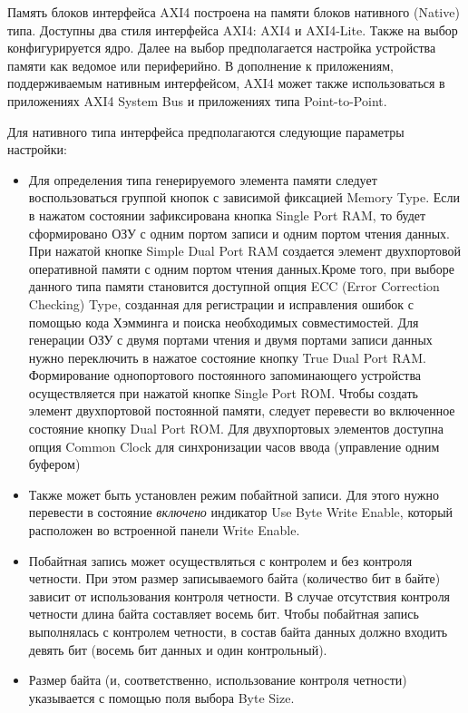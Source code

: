 Память блоков интерфейса AXI4 построена на памяти блоков нативного (Native) типа. Доступны два стиля интерфейса AXI4: AXI4 и AXI4-Lite. Также на выбор конфигурируется ядро. Далее на выбор предполагается настройка устройства памяти как ведомое или периферийно. В дополнение к приложениям, поддерживаемым нативным интерфейсом, AXI4 может также использоваться в приложениях AXI4 System Bus и приложениях типа Point-to-Point.

Для нативного типа интерфейса предполагаются следующие параметры настройки:

\begin{itemize}
\item Для определения типа генерируемого элемента памяти следует воспользоваться группой кнопок с зависимой фиксацией Memory Type. Если в нажатом состоянии зафиксирована кнопка Single Port RAM, то будет сформировано ОЗУ с одним портом записи и одним портом чтения данных. При нажатой кнопке Simple Dual Port RAM создается элемент двухпортовой оперативной памяти с одним портом чтения данных.Кроме того, при выборе данного типа памяти становится доступной опция ECC (Error Correction Checking) Type, созданная для регистрации и исправления ошибок с помощью кода Хэмминга и поиска необходимых совместимостей. Для генерации ОЗУ с двумя портами чтения и двумя портами записи данных нужно переключить в нажатое состояние кнопку True Dual Port RAM. Формирование однопортового постоянного запоминающего устройства осуществляется при нажатой кнопке Single Port ROM. Чтобы создать элемент двухпортовой постоянной памяти, следует перевести во включенное состояние кнопку Dual Port ROM. Для двухпортовых элементов доступна опция Common Clock для синхронизации часов ввода (управление одним буфером)
\item Также может быть установлен режим побайтной записи. Для этого нужно перевести в состояние \emph {включено} индикатор Use Byte Write Enable, который расположен во встроенной панели Write Enable.
\item Побайтная запись может осуществляться с контролем и без контроля четности. При этом размер записываемого байта (количество бит в байте) зависит от использования контроля четности. В случае отсутствия контроля четности длина байта составляет восемь бит. Чтобы побайтная запись выполнялась с контролем четности, в состав байта данных должно входить девять бит (восемь бит данных и один контрольный). 
\item Размер байта (и, соответственно, использование контроля четности) указывается с помощью поля выбора Byte Size.

\end{itemize}
